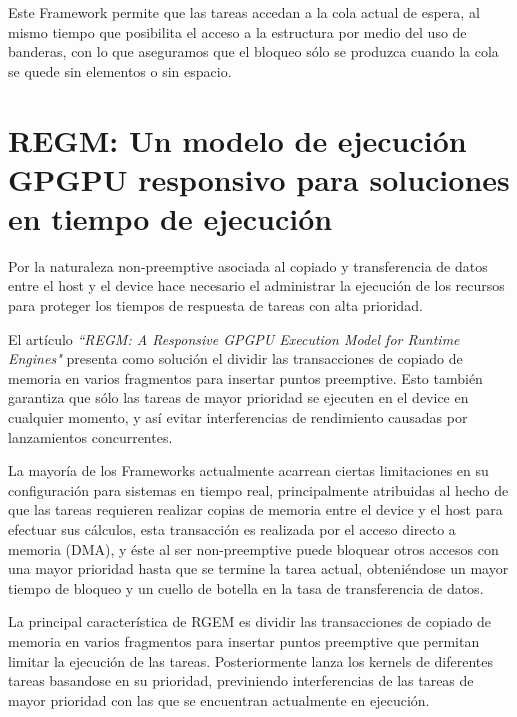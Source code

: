 Este Framework permite que las tareas accedan a la cola actual de espera, al mismo tiempo que posibilita el acceso a la estructura por medio del uso de banderas, con lo que aseguramos que el bloqueo sólo se produzca cuando la cola se quede sin elementos o sin espacio.

\section{REGM: Un modelo de ejecución GPGPU responsivo para soluciones en tiempo de ejecución}

Por la naturaleza non-preemptive asociada al copiado y transferencia de datos entre el host y el device hace necesario el administrar la ejecución de los recursos para proteger los tiempos de respuesta de tareas con alta prioridad. 

El artículo \textit{``REGM: A Responsive GPGPU Execution Model for Runtime Engines"}\cite{RGEM} presenta como solución el dividir las transacciones de copiado de memoria en varios fragmentos para insertar puntos preemptive. Esto también garantiza que sólo las tareas de mayor prioridad se ejecuten en el device en cualquier momento, y así evitar interferencias de rendimiento causadas por lanzamientos concurrentes.

\vspace{0.3cm}

La mayoría de los Frameworks actualmente acarrean ciertas limitaciones en su configuración para sistemas en tiempo real, principalmente atribuidas al hecho de que las tareas requieren realizar copias de memoria entre el device y el host para efectuar sus cálculos, esta transacción es realizada por el acceso directo a memoria (DMA), y éste al ser non-preemptive puede bloquear otros accesos con una mayor prioridad hasta que se termine la tarea actual, obteniéndose un mayor tiempo de bloqueo y un cuello de botella en la tasa de transferencia de datos.

\vspace{0.3cm}

La principal característica de RGEM es dividir las transacciones de copiado de memoria en varios fragmentos para insertar puntos preemptive que permitan limitar la ejecución de las tareas. Posteriormente lanza los kernels de diferentes tareas basandose en su prioridad, previniendo interferencias de las tareas de mayor prioridad con las que se encuentran actualmente en ejecución.

